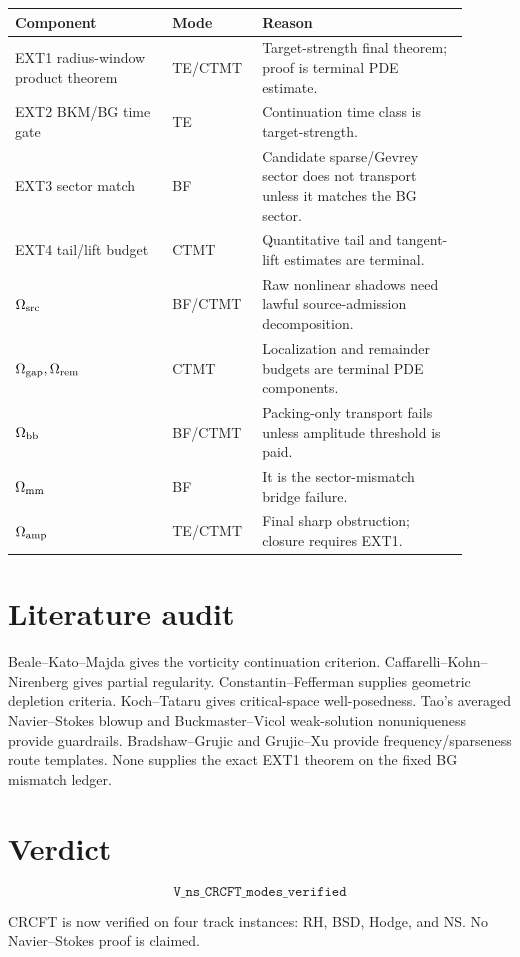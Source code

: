 \documentclass[11pt]{article}
\begin{document}
\begin{center}
\begin{tabular}{p{0.32\linewidth}p{0.16\linewidth}p{0.42\linewidth}}
\toprule
Component & Mode & Reason\\
\midrule
EXT1 radius-window product theorem & TE/CTMT & Target-strength final theorem; proof is terminal PDE estimate.\\
EXT2 BKM/BG time gate & TE & Continuation time class is target-strength.\\
EXT3 sector match & BF & Candidate sparse/Gevrey sector does not transport unless it matches the BG sector.\\
EXT4 tail/lift budget & CTMT & Quantitative tail and tangent-lift estimates are terminal.\\
\(\Omega_{\rm src}\) & BF/CTMT & Raw nonlinear shadows need lawful source-admission decomposition.\\
\(\Omega_{\rm gap},\Omega_{\rm rem}\) & CTMT & Localization and remainder budgets are terminal PDE components.\\
\(\Omega_{\rm bb}\) & BF/CTMT & Packing-only transport fails unless amplitude threshold is paid.\\
\(\Omega_{\rm mm}\) & BF & It is the sector-mismatch bridge failure.\\
\(\Omega_{\rm amp}\) & TE/CTMT & Final sharp obstruction; closure requires EXT1.\\
\bottomrule
\end{tabular}
\end{center}

\section{Literature audit}

Beale--Kato--Majda gives the vorticity continuation criterion. Caffarelli--Kohn--Nirenberg gives partial regularity. Constantin--Fefferman supplies geometric depletion criteria. Koch--Tataru gives critical-space well-posedness. Tao's averaged Navier--Stokes blowup and Buckmaster--Vicol weak-solution nonuniqueness provide guardrails. Bradshaw--Grujic and Grujic--Xu provide frequency/sparseness route templates. None supplies the exact EXT1 theorem on the fixed BG mismatch ledger.

\section{Verdict}

\[
\boxed{\texttt{V\_ns\_CRCFT\_modes\_verified}}
\]

CRCFT is now verified on four track instances: RH, BSD, Hodge, and NS. No Navier--Stokes proof is claimed.
\end{document}
